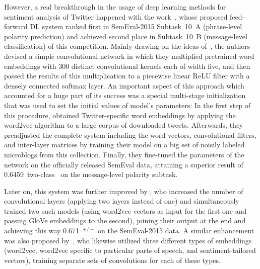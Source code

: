 However, a real breakthrough in the usage of deep learning methods for
sentiment analysis of Twitter happened with the
work~\citet{Severyn:15}, whose proposed feed-forward DL system ranked
first in SemEval-2015 Subtask~10~A (phrase-level polarity prediction)
\cite{Rosenthal:15} and achieved second place in Subtask~10~B
(message-level classification) of this competition.  Mainly drawing on
the ideas of~\citet{Kalchbrenner:14}, the authors devised a simple
convolutional network in which they multiplied pretrained word
embeddings with 300 distinct convolutional kernels each of width five,
and then passed the results of this multiplication to a piecewise
linear ReLU filter with a densely connected softmax layer.  An
important aspect of this approach which accounted for a huge part of
its success was a special multi-stage initialization that was used to
set the initial values of model's parameters: In the first step of
this procedure, \citeauthor{Severyn:15} obtained Twitter-specific word
embeddings by applying the word2vec algorithm to a large corpus of
downloaded tweets.  Afterwards, they preadjusted the complete system
including the word vectors, convolutional filters, and inter-layer
matrices by training their model on a big set of noisily labeled
microblogs from this collection.  Finally, they fine-tuned the
parameters of the network on the officially released SemEval data,
attaining a superior result of 0.6459~two-class~\F{} on the
message-level polarity subtask.

Later on, this system was further improved by \citet{Deriu:16}, who
increased the number of convolutional layers (applying two layers
instead of one) and simultaneously trained two such models (using
word2vec vectors as input for the first one and passing GloVe
embeddings \cite{Pennington:14} to the second), joining their output
at the end and achieving this way 0.671~\F$^{+/-}$ on the SemEval-2015
data.  A similar enhancement was also proposed by~\citet{Rouvier:16},
who likewise utilized three different types of embeddings (word2vec,
word2vec specific to particular parts of speech, and
sentiment-tailored vectors), training separate sets of convolutions
for each of these types.



